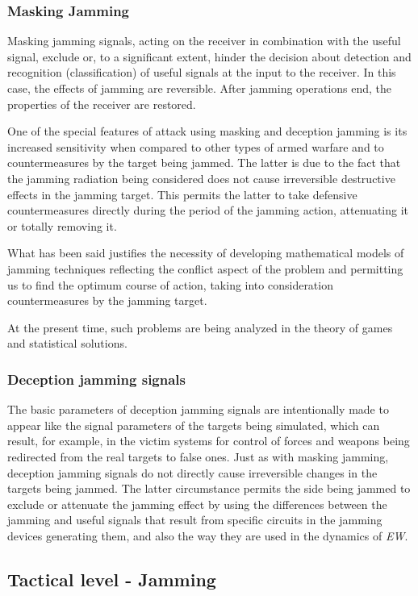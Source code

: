 \documentclass[english,purist]{ist-report}
\begin{document}
\subsubsection{Masking Jamming}
Masking jamming signals, acting on the receiver in combination with
the useful signal, exclude or, to a significant extent, hinder the decision about detection and recognition (classification) of useful signals at the input to the receiver. In this case, the effects of jamming are reversible. After jamming operations end, the properties of the receiver are restored. 

One of the special features of attack using masking and deception
jamming is its increased sensitivity when compared to other types of armed warfare and to countermeasures by the target being jammed. The latter is due to the fact that the jamming radiation being considered does not cause irreversible destructive effects in the jamming target. This permits the latter to take defensive countermeasures directly during the period of the jamming action, attenuating it or totally removing it. 

What has been said justifies the necessity of developing mathematical models of jamming techniques reflecting the conflict aspect of the problem and permitting us to find the optimum course of action, taking into consideration countermeasures by the jamming target.

At the present time, such problems are being analyzed in the theory of
games and statistical solutions. 



\subsubsection{Deception jamming signals}
The basic parameters of deception jamming signals are intentionally
made to appear like the signal parameters of the targets being simulated, which can result, for example, in the victim systems for control of forces and weapons being redirected from the real targets to false ones. Just as with masking jamming, deception jamming signals do not directly cause irreversible changes in the targets being jammed. The latter circumstance permits the side being jammed to exclude or attenuate the jamming effect by using the differences between the jamming and useful signals that result from specific circuits in the jamming devices generating them, and also the way they are used in the dynamics of \textit{EW}.


\subsection{Tactical level - Jamming}
\end{document}
